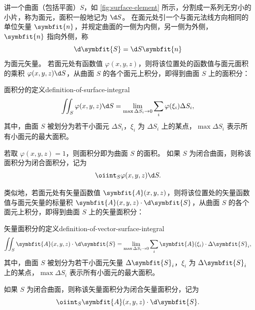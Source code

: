 \bigskip


讲一个曲面（包括平面）$ S $，如 \cref{fig:surface-element} 所示，分割成一系列无穷小的小片，称为面元，面积一般地记为 $ \d S $。
在面元处引一个与面元法线方向相同的单位矢量 $ \symbfit{n} $，并规定曲面的一侧为内侧，另一侧为外侧，$ \symbfit{n} $ 指向外侧，称
\begin{equation*}
    \d \symbfit{S} = \d S \symbfit{n}
\end{equation*}
为面元矢量。
若面元处有函数值 $ \varphi (x, y, z) $，则将该位置处的函数值与面元面积的乘积 $ \varphi (x, y, z) \d S $，从曲面 $ S $ 的各个面元上积分，即得到曲面 $ S $ 上的面积分：
\begin{definition}{面积分的定义}{definition-of-surface-integral}
    \begin{equation}
        \iint_S \varphi (x, y, z) \d S = \lim_{\max \Delta S_i \to 0} \sum_{i} \varphi (\xi_i) \Delta S_i ,
    \end{equation}
    其中，曲面 $ S $ 被划分为若干小面元 $ \Delta S_i $，$ \xi_i $ 为 $ \Delta S_i $ 上的某点，$ \max \Delta S_i $ 表示所有小面元的最大面积。
\end{definition}

若取 $ \varphi (x, y, z) = 1 $，则面积分即为曲面 $ S $ 的面积。
如果 $ S $ 为闭合曲面，则称该面积分为闭合面积分，记为
\begin{equation}
    \oiint_S \varphi (x, y, z) \d S .
\end{equation}

\bigskip

类似地，若面元处有矢量函数值 $ \symbfit{A} (x, y, z) $，则将该位置处的矢量函数值与面元矢量的标量积 $ \symbfit{A} (x, y, z) \cdot \d \symbfit{S} $，从曲面 $ S $ 的各个面元上积分，即得到曲面 $ S $ 上的矢量面积分：
\begin{definition}{矢量面积分的定义}{definition-of-vector-surface-integral}
    \begin{equation}
        \iint_S \symbfit{A} (x, y, z) \cdot \d \symbfit{S} = \lim_{\max \Delta S_i \to 0} \sum_{i} \symbfit{A} (\xi_i) \cdot \Delta \symbfit{S}_i ,
    \end{equation}
    其中，曲面 $ S $ 被划分为若干小面元矢量 $ \Delta \symbfit{S}_i $，$ \xi_i $ 为 $ \Delta \symbfit{S}_i $ 上的某点，$ \max \Delta S_i $ 表示所有小面元的最大面积。
\end{definition}

如果 $ S $ 为闭合曲面，则称该矢量面积分为闭合矢量面积分，记为
\begin{equation}
    \oiint_S \symbfit{A} (x, y, z) \cdot \d \symbfit{S} .
\end{equation}

